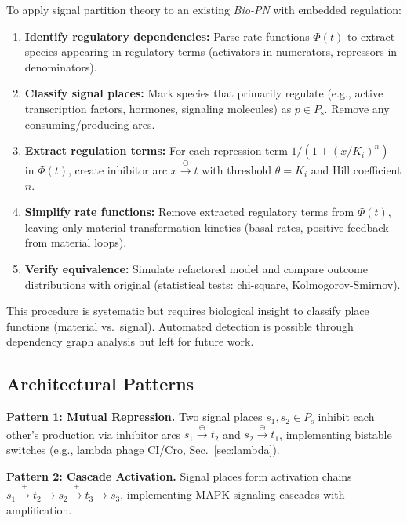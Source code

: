 \documentclass[twocolumn,10pt]{article}
\newcommand{\biopn}{\textit{Bio-PN}}
\newcommand{\Ps}{P_{\text{s}}}
\begin{document}
To apply signal partition theory to an existing \biopn{} with embedded regulation:

\begin{enumerate}
\item \textbf{Identify regulatory dependencies:} Parse rate functions $\Phi(t)$ to extract species appearing in regulatory terms (activators in numerators, repressors in denominators).

\item \textbf{Classify signal places:} Mark species that primarily regulate (e.g., active transcription factors, hormones, signaling molecules) as $p \in \Ps$. Remove any consuming/producing arcs.

\item \textbf{Extract regulation terms:} For each repression term $1/(1 + (x/K_i)^n)$ in $\Phi(t)$, create inhibitor arc $x \xrightarrow{\ominus} t$ with threshold $\theta = K_i$ and Hill coefficient $n$.

\item \textbf{Simplify rate functions:} Remove extracted regulatory terms from $\Phi(t)$, leaving only material transformation kinetics (basal rates, positive feedback from material loops).

\item \textbf{Verify equivalence:} Simulate refactored model and compare outcome distributions with original (statistical tests: chi-square, Kolmogorov-Smirnov).
\end{enumerate}

This procedure is systematic but requires biological insight to classify place functions (material vs.~signal). Automated detection is possible through dependency graph analysis but left for future work.

\subsection{Architectural Patterns}

\textbf{Pattern 1: Mutual Repression.} Two signal places $s_1, s_2 \in \Ps$ inhibit each other's production via inhibitor arcs $s_1 \xrightarrow{\ominus} t_2$ and $s_2 \xrightarrow{\ominus} t_1$, implementing bistable switches (e.g., lambda phage CI/Cro, Sec.~\ref{sec:lambda}).

\textbf{Pattern 2: Cascade Activation.} Signal places form activation chains $s_1 \xrightarrow{+} t_2 \rightarrow s_2 \xrightarrow{+} t_3 \rightarrow s_3$, implementing MAPK signaling cascades with amplification.
\end{document}

